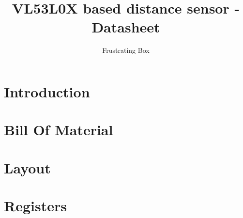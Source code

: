 \documentclass[12pt,a4paper]{article}
\author{Frustrating Box}
\title{VL53L0X based distance sensor - Datasheet}
\begin{document}
\maketitle


\section{Introduction}
	
\section{Bill Of Material}
	
\section{Layout}
	
\section{Registers}
	
\end{document}
